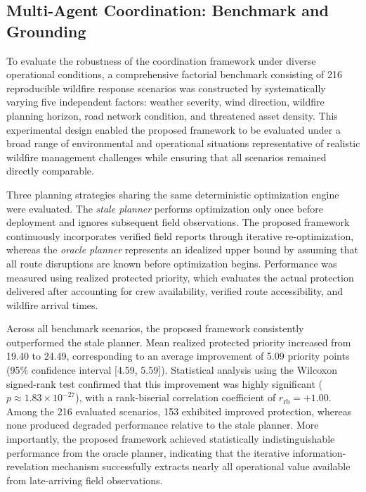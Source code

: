 \documentclass{ieeeaccess}
\begin{document}
\subsection{Multi-Agent Coordination: Benchmark and Grounding}
\label{sec:coord-bench}

To evaluate the robustness of the coordination framework under diverse operational conditions, a comprehensive factorial benchmark consisting of 216 reproducible wildfire response scenarios was constructed by systematically varying five independent factors: weather severity, wind direction, wildfire planning horizon, road network condition, and threatened asset density. This experimental design enabled the proposed framework to be evaluated under a broad range of environmental and operational situations representative of realistic wildfire management challenges while ensuring that all scenarios remained directly comparable.

Three planning strategies sharing the same deterministic optimization engine were evaluated. The \emph{stale planner} performs optimization only once before deployment and ignores subsequent field observations. The proposed framework continuously incorporates verified field reports through iterative re-optimization, whereas the \emph{oracle planner} represents an idealized upper bound by assuming that all route disruptions are known before optimization begins. Performance was measured using realized protected priority, which evaluates the actual protection delivered after accounting for crew availability, verified route accessibility, and wildfire arrival times.

Across all benchmark scenarios, the proposed framework consistently outperformed the stale planner. Mean realized protected priority increased from 19.40 to 24.49, corresponding to an average improvement of 5.09 priority points (95\% confidence interval [4.59, 5.59]). Statistical analysis using the Wilcoxon signed-rank test confirmed that this improvement was highly significant ($p \approx 1.83\times10^{-27}$), with a rank-biserial correlation coefficient of $r_{\mathrm{rb}}=+1.00$. Among the 216 evaluated scenarios, 153 exhibited improved protection, whereas none produced degraded performance relative to the stale planner. More importantly, the proposed framework achieved statistically indistinguishable performance from the oracle planner, indicating that the iterative information-revelation mechanism successfully extracts nearly all operational value available from late-arriving field observations.
\end{document}
